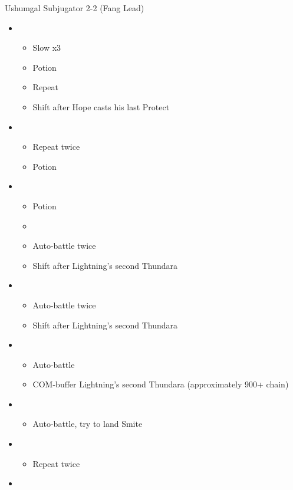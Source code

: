 \documentclass{report}
\begin{document}
\begin{battle}{Ushumgal Subjugator 2-2 (Fang Lead)}
\begin{itemize}
    \item \fifth
    \begin{itemize}
        \item Slow x3
        \item Potion
        \item Repeat
        \item Shift after Hope casts his last Protect
    \end{itemize}
    \item \third
    \begin{itemize}
        \item Repeat twice
        \item Potion
    \end{itemize}
    \item \second
    \begin{itemize}
        \item Potion
        \item \stagger
        \item Auto-battle twice
        \item Shift after Lightning's second Thundara
    \end{itemize}
    \item \sixth
    \begin{itemize}
        \item Auto-battle twice
        \item Shift after Lightning's second Thundara
    \end{itemize}
    \item \second
    \begin{itemize}
        \item Auto-battle
        \item COM-buffer Lightning's second Thundara (approximately 900+ chain)
    \end{itemize}
    \item \first
    \begin{itemize}
        \item Auto-battle, try to land Smite
    \end{itemize}
    \item \third
    \begin{itemize}
        \item Repeat twice
    \end{itemize}
    \item \fourth

\end{itemize}
\end{battle}
\end{document}
